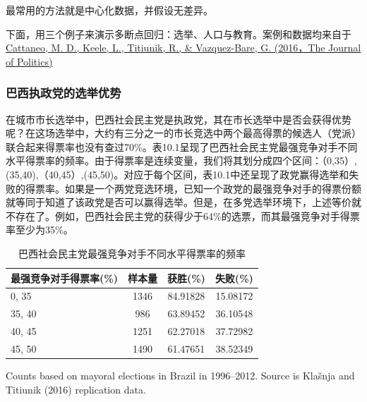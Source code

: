 \documentclass[cn,12pt,math=newtx,citestyle=gb7714-2015,bibstyle=gb7714-2015]{elegantbook}
\begin{document}
    最常用的方法就是中心化数据，并假设无差异。
    
    下面，用三个例子来演示多断点回归：选举、人口与教育。案例和数据均来自于\href{https://www.journals.uchicago.edu/doi/pdf/10.1086/686802}{Cattaneo, M. D., Keele, L., Titiunik, R., \& Vazquez-Bare, G. (2016，The Journal of Politics)}
    
    \subsubsection{巴西执政党的选举优势}
    
    在城市市长选举中，巴西社会民主党是执政党，其在市长选举中是否会获得优势呢？在这场选举中，大约有三分之一的市长竞选中两个最高得票的候选人（党派）联合起来得票率也没有查过70\%。表10.1呈现了巴西社会民主党最强竞争对手不同水平得票率的频率。由于得票率是连续变量，我们将其划分成四个区间：（0,35）,(35,40),（40,45）,(45,50)。对应于每个区间，表10.1中还呈现了政党赢得选举和失败的得票率。如果是一个两党竞选环境，已知一个政党的最强竞争对手的得票份额就等同于知道了该政党是否可以赢得选举。但是，在多党选举环境下，上述等价就不存在了。例如，巴西社会民主党的获得少于64\%的选票，而其最强竞争对手得票率至少为35\%。
    
    	\begin{table}[htbp]\centering
    	\scriptsize
    	\caption{巴西社会民主党最强竞争对手不同水平得票率的频率}
    	\label{Mrd}
    	\begin{center}
    		\begin{threeparttable}
    			\begin{tabular}{l*{3}{c}}
    				\toprule
    				\multicolumn{1}{l}{\textbf{最强竞争对手得票率(\%)}}&
    				\multicolumn{1}{c}{\textbf{样本量}}&
    				\multicolumn{1}{c}{获胜(\%)}&
    				\multicolumn{1}{c}{失败(\%)} \\
    				\midrule
    				0, 35	&1346&	84.91828&	15.08172\\
    				35, 40&	986&	63.89452	&36.10548\\
    				40, 45&	1251&	62.27018&	37.72982\\
    				45, 50&	1490&	61.47651&	38.52349\\
    				\bottomrule
    			\end{tabular}
    			\begin{tablenotes}
    				\tiny
    				\item  Counts based on mayoral elections in Brazil in 1996–2012. Source is Klašnja and Titiunik (2016) replication data.
    			\end{tablenotes}
    		\end{threeparttable}
    	\end{center}
    \end{table}
    
\end{document}
